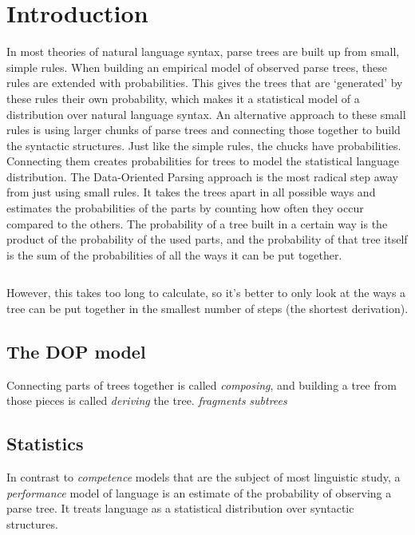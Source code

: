 
\section{Introduction}

In most theories of natural language syntax, parse trees are built up from small, simple rules. When building an empirical model of observed parse trees, these rules are extended with probabilities. This gives the trees that are `generated' by these rules their own probability, which makes it a statistical model of a distribution over natural language syntax.
An alternative approach to these small rules is using larger chunks of parse trees and connecting those together to build the syntactic structures. Just like the simple rules, the chucks have probabilities. Connecting them creates probabilities for trees to model the statistical language distribution.
The Data-Oriented Parsing approach is the most radical step away from just using small rules. It takes the trees apart in all possible ways and estimates the probabilities of the parts by counting how often they occur compared to the others. The probability of a tree built in a certain way is the product of the probability of the used parts, and the probability of that tree itself is the sum of the probabilities of all the ways it can be put together.

$$$$

However, this takes too long to calculate, so it's better to only look at the ways a tree can be put together in the smallest number of steps (the shortest derivation).

\subsection{The DOP model}

Connecting parts of trees together is called \emph{composing}, and building a tree from those pieces is called \emph{deriving} the tree.
\emph{fragments}
\emph{subtrees}

\subsection{Statistics}
In contrast to \emph{competence} models that are the subject of most linguistic study, a \emph{performance} model of language is an estimate of the probability of observing a parse tree. It treats language as a statistical distribution over syntactic structures.


